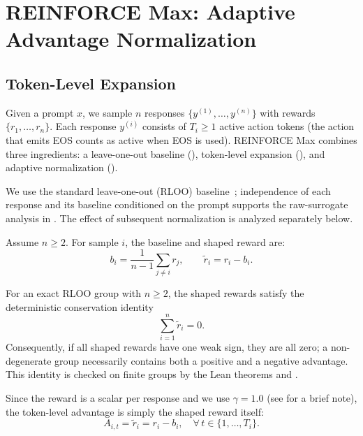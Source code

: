 \section{REINFORCE Max: Adaptive Advantage Normalization}
\label{sec:reinforce-max}

\subsection{Token-Level Expansion}
\label{sec:token-expand}

Given a prompt $x$, we sample $n$ responses $\{y^{(1)}, \ldots, y^{(n)}\}$ with rewards $\{r_1, \ldots, r_n\}$. Each response
$y^{(i)}$ consists of $T_i\ge 1$ active action tokens (the action that emits EOS counts as active when EOS is used). REINFORCE Max combines three ingredients: a leave-one-out baseline
(), token-level expansion (), and adaptive normalization ().

We use the standard leave-one-out (RLOO) baseline~\citep{ahmadian2024back}; independence of each response and its baseline conditioned on the prompt supports the raw-surrogate analysis in . The effect of subsequent normalization is analyzed separately below.

\begin{definition}
\label{def:rloo}
Assume $n \ge 2$. For sample $i$, the baseline and shaped reward are:
\begin{equation}
    b_i = \frac{1}{n-1}\sum_{j \neq i} r_j, \qquad \tilde{r}_i = r_i - b_i.
    \label{eq:rloo-baseline}
\end{equation}
\end{definition}

For an exact RLOO group with $n\ge2$, the shaped rewards satisfy the deterministic conservation identity
\begin{equation*}
    \sum_{i=1}^{n}\tilde r_i = 0.
\end{equation*}
Consequently, if all shaped rewards have one weak sign, they are all zero; a non-degenerate group necessarily contains both a positive
and a negative advantage. This identity is checked on finite groups by the Lean theorems
 and .

Since the reward is a scalar per response and we use $\gamma = 1.0$ (see  for a brief note), the token-level advantage is simply the shaped reward itself:
\begin{equation*}
    A_{i,t} = \tilde{r}_i = r_i - b_i, \quad \forall\, t \in \{1, \ldots, T_i\}.
\end{equation*}

